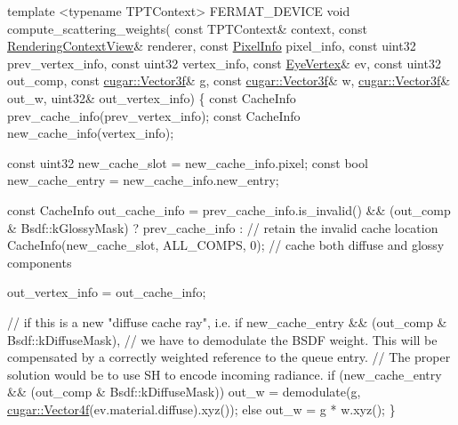 \begin{DoxyCodeInclude}
    \textcolor{keyword}{template} <\textcolor{keyword}{typename} TPTContext>
    FERMAT\_DEVICE
    \textcolor{keywordtype}{void} compute\_scattering\_weights(
        \textcolor{keyword}{const} TPTContext&           context,
        \textcolor{keyword}{const} \hyperlink{struct_rendering_context_view}{RenderingContextView}& renderer,
        \textcolor{keyword}{const} \hyperlink{union_pixel_info}{PixelInfo}                pixel\_info,
        \textcolor{keyword}{const} uint32                prev\_vertex\_info,
        \textcolor{keyword}{const} uint32                vertex\_info,
        \textcolor{keyword}{const} \hyperlink{struct_eye_vertex}{EyeVertex}&           ev,
        \textcolor{keyword}{const} uint32                out\_comp,
        \textcolor{keyword}{const} \hyperlink{structcugar_1_1_vector}{cugar::Vector3f}&       g,
        \textcolor{keyword}{const} \hyperlink{structcugar_1_1_vector}{cugar::Vector3f}&       w,
              \hyperlink{structcugar_1_1_vector}{cugar::Vector3f}&       out\_w,
              uint32&               out\_vertex\_info)
    \{
        \textcolor{keyword}{const} CacheInfo prev\_cache\_info(prev\_vertex\_info);
        \textcolor{keyword}{const} CacheInfo new\_cache\_info(vertex\_info);

        \textcolor{keyword}{const} uint32 new\_cache\_slot  = new\_cache\_info.pixel;
        \textcolor{keyword}{const} \textcolor{keywordtype}{bool}   new\_cache\_entry = new\_cache\_info.new\_entry;

        \textcolor{keyword}{const} CacheInfo out\_cache\_info = prev\_cache\_info.is\_invalid() && (out\_comp & Bsdf::kGlossyMask) ?
            prev\_cache\_info :                           \textcolor{comment}{// retain the invalid cache location}
            CacheInfo(new\_cache\_slot, ALL\_COMPS, 0);    \textcolor{comment}{// cache both diffuse and glossy components}

        out\_vertex\_info = out\_cache\_info;

        \textcolor{comment}{// if this is a new "diffuse cache ray", i.e. if new\_cache\_entry && (out\_comp &
       Bsdf::kDiffuseMask),}
        \textcolor{comment}{// we have to demodulate the BSDF weight. This will be compensated by a correctly weighted
       reference to the queue entry.}
        \textcolor{comment}{// The proper solution would be to use SH to encode incoming radiance.}
        \textcolor{keywordflow}{if} (new\_cache\_entry && (out\_comp & Bsdf::kDiffuseMask))
            out\_w = demodulate(g, \hyperlink{structcugar_1_1_vector}{cugar::Vector4f}(ev.material.diffuse).xyz());
        \textcolor{keywordflow}{else}
            out\_w = g * w.xyz();
    \}
\end{DoxyCodeInclude}
